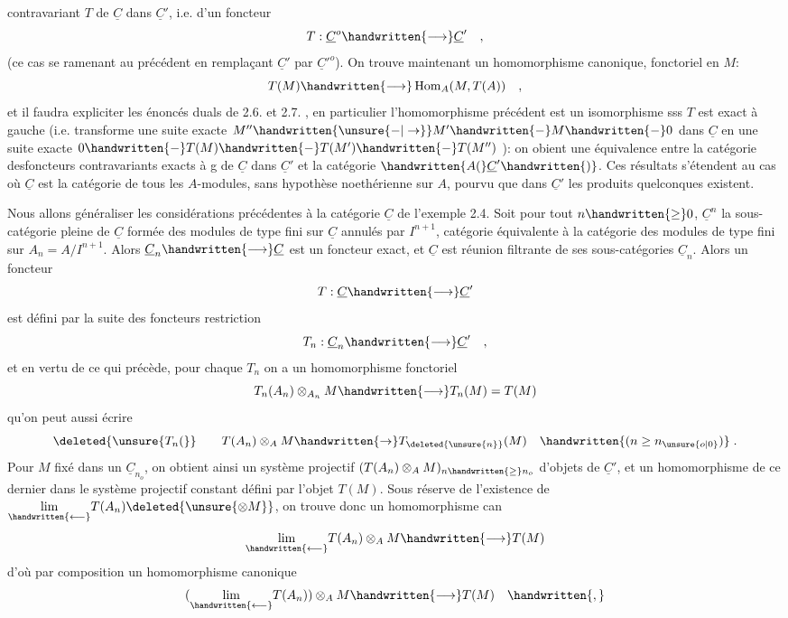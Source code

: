 contravariant $T$ de $\underline C$ dans $\underline C'$, i.e. d'un foncteur
\[
T:\underline C^{o}\handwritten{\longrightarrow}\underline C'\quad,
\]
(ce cas se ramenant au précédent en remplaçant $\underline C'$ par $ {\underline C'}^{o}$). On trouve
maintenant un homomorphisme canonique, fonctoriel en $M$:
\[
T(M)\handwritten{\longrightarrow}\operatorname{Hom}_A(M,T(A))\quad,
\]
et il faudra expliciter les énoncés duals de 2.6. et 2.7. , en particulier
l'homomorphisme précédent est un isomorphisme sss $T$ est exact à gauche
(i.e. transforme une suite exacte $M''\handwritten{\unsure{-|\to}}M'\handwritten{-}M\handwritten{-}0$ dans $\underline C$ en une suite
exacte $0\handwritten{-}T(M)\handwritten{-}T(M')\handwritten{-}T(M'')$ ): on obient une équivalence entre la
catégorie des\handwritten{\unsure{/}}foncteurs contravariants exacts à g de $\underline C$ dans $\underline C'$ et la
catégorie $\handwritten{A(}\underline C'\handwritten{)}$. Ces résultats s'étendent  au cas où $\underline C$ est la catégorie de
tous les $A$-modules, sans hypothèse noethérienne sur $A$, pourvu que dans $\underline C'$
les produits quelconques existent.

Nous allons généraliser les considérations précédentes à la catégorie
$\underline C$ de l'exemple 2.4. Soit pour tout $n\handwritten{\geq}0$, $\underline C^n$ la sous-catégorie pleine de
$\underline C$ formée des modules de type fini sur $\underline C$ annulés par $I^{n+1}$, catégorie
équivalente à la catégorie des modules de type fini sur $A_n=A/I^{n+1}$. Alors
$\underline C_n\handwritten{\longrightarrow}\underline C$ est un foncteur exact, et $\underline C$ est réunion filtrante de ses sous-catégories $\underline C_n$. Alors un foncteur 
\[
T:\underline C\handwritten{\longrightarrow}\underline C'
\]
est défini par la suite des foncteurs restriction
\[
T_n:\underline C_n\handwritten{\longrightarrow}\underline C'\quad,
\]
et en vertu de ce qui précède, pour chaque $T_n$ on a un homomorphisme
fonctoriel
\[
T_n(A_n)\otimes_{A_n}M\handwritten{\longrightarrow}T_n(M)=T(M)
\]
qu'on peut aussi écrire
\[
\deleted{\unsure{T_n(}}\qquad T(A_n)\otimes_A M\handwritten{\to}T_{\deleted{\unsure{n}}}(M)\quad\handwritten{(n\geq n_{\unsure{o|0}})}\;.
\]
Pour $M$ fixé dans un $\underline C_{n_o}$, on obtient ainsi un système projectif 
 $(T(A_n)\otimes_A M)_{n\handwritten{\geq}n_o}$ d'objets de $\underline C'$, et un homomorphisme de ce dernier dans
le système projectif constant défini par  l'objet $T(M)$. Sous réserve
de l'existence de $\underset{\handwritten{\longleftarrow}}{\lim}T(A_n)\deleted{\unsure{\otimes M}}$, on trouve donc un homomorphisme can
\[
\underset{\handwritten{\longleftarrow}}{\lim}T(A_n)\otimes_A M\handwritten{\longrightarrow}T(M)
\]
d'où par composition un homomorphisme canonique
\[
(\underset{\handwritten{\longleftarrow}}{\lim}T(A_n))\otimes_A M\handwritten{\longrightarrow}T(M)\quad\handwritten{,}
\]

